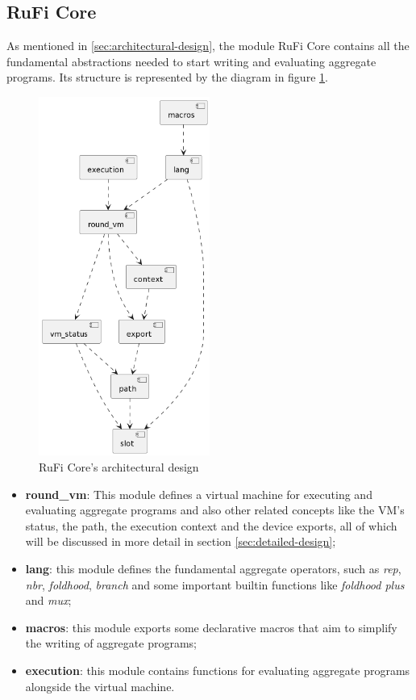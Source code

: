 \subsection{RuFi Core}
\label{subsec:rufi-core}
As mentioned in \ref{sec:architectural-design}, the module RuFi Core contains all the fundamental abstractions needed to start writing and evaluating aggregate programs.
Its structure is represented by the diagram in figure \cref{fig:rufi-core-architecture}.

\begin{figure}[ht!]
    \centering
    \includegraphics[width=0.5\textwidth]{figures/diagrams/img/rufi-core-architecture.png}
    \caption{RuFi Core's architectural design}
    \label{fig:rufi-core-architecture}
\end{figure}

\begin{itemize}
    \item \textbf{round\_vm}: This module defines a virtual machine for executing and evaluating aggregate programs and also other related concepts like the VM's status,
          the path, the execution context and the device exports, all of which will be discussed in more detail in section \ref{sec:detailed-design};
    \item \textbf{lang}: this module defines the fundamental aggregate operators, such as \textit{rep}, \textit{nbr}, \textit{foldhood}, \textit{branch} and some important builtin functions like \textit{foldhood plus} and \textit{mux};
    \item \textbf{macros}: this module exports some declarative macros that aim to simplify the writing of aggregate programs;\
    \item \textbf{execution}: this module contains functions for evaluating aggregate programs alongside the virtual machine.
\end{itemize}

